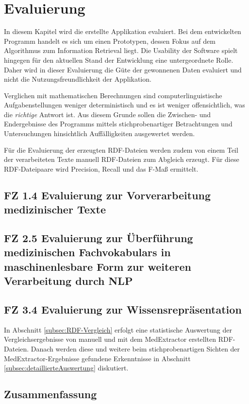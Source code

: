 \chapter{Evaluierung}
\label{ch:evaluierung}

In diesem Kapitel wird die erstellte Applikation evaluiert. Bei dem entwickelten Programm handelt es sich um einen Prototypen, dessen Fokus auf dem Algorithmus zum Information Retrieval liegt. Die Usability der Software spielt hingegen für den aktuellen Stand der Entwicklung eine untergeordnete Rolle. Daher wird in dieser Evaluierung die Güte der gewonnenen Daten evaluiert und nicht die Nutzungsfreundlichkeit der Applikation.

 
Verglichen mit mathematischen Berechnungen sind computerlinguistische Aufgabenstellungen weniger deterministisch und es ist weniger offensichtlich, was die \emph{richtige} Antwort ist.  Aus diesem Grunde sollen die Zwischen- und Endergebnisse des Programms mittels stichprobenartiger Betrachtungen und Untersuchungen hinsichtlich Auffälligkeiten ausgewertet werden. 

Für die Evaluierung der erzeugten RDF-Dateien werden zudem von einem Teil der verarbeiteten Texte manuell RDF-Dateien zum Abgleich erzeugt. Für diese RDF-Dateipaare wird Precision, Recall und das F-Maß ermittelt.


\section{FZ 1.4 Evaluierung zur Vorverarbeitung medizinischer Texte}
\label{sec:FZ1.4} 





\section[FZ 2.5 Evaluierung zur Überführung med. Fachvokabulars]{FZ 2.5 Evaluierung zur Überführung medizinischen Fachvokabulars in maschinenlesbare Form zur weiteren Verarbeitung durch NLP}
\label{sec:FZ2.5}



\section{FZ 3.4 Evaluierung zur Wissensrepräsentation}
\label{sec:FZ3.4} 
In Abschnitt \ref{subsec:RDF-Vergleich} erfolgt eine statistische Auswertung der Vergleichsergebnisse von manuell und mit dem MedExtractor erstellten RDF-Dateien. Danach werden diese und weitere beim stichprobenartigen Sichten der Med\-Extractor-Ergebnisse gefundene Erkenntnisse in Abschnitt \ref{subsec:detaillierteAuswertung} diskutiert.










\section{Zusammenfassung}
\label{sec:zusammenfassung_evaluierung} 

